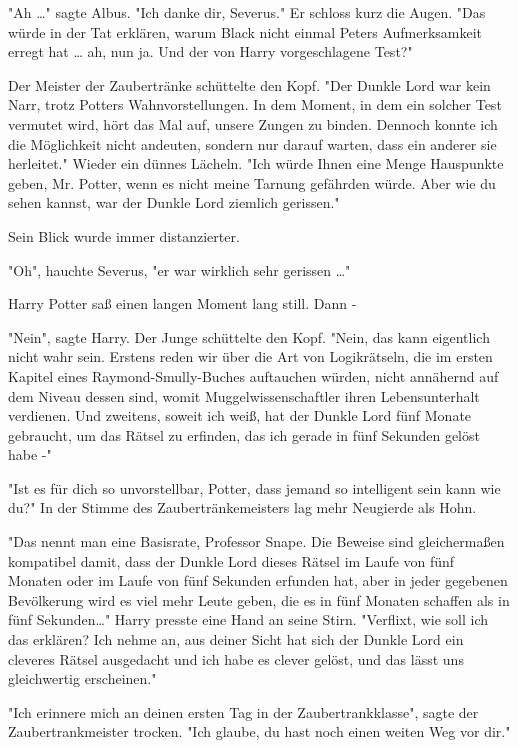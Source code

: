 {"Ah …" sagte Albus. "Ich danke dir, Severus." Er schloss kurz die Augen. "Das würde in der Tat erklären, warum Black nicht einmal Peters Aufmerksamkeit erregt hat … ah, nun ja. Und der von Harry vorgeschlagene Test?"

Der Meister der Zaubertränke schüttelte den Kopf. "Der Dunkle Lord war kein Narr, trotz Potters Wahnvorstellungen. In dem Moment, in dem ein solcher Test vermutet wird, hört das Mal auf, unsere Zungen zu binden. Dennoch konnte ich die Möglichkeit nicht andeuten, sondern nur darauf warten, dass ein anderer sie herleitet." Wieder ein dünnes Lächeln. "Ich würde Ihnen eine Menge Hauspunkte geben, Mr. Potter, wenn es nicht meine Tarnung gefährden würde. Aber wie du sehen kannst, war der Dunkle Lord ziemlich gerissen."

Sein Blick wurde immer distanzierter.

"Oh", hauchte Severus, "er war wirklich sehr gerissen …"

Harry Potter saß einen langen Moment lang still. Dann -

"Nein", sagte Harry. Der Junge schüttelte den Kopf. "Nein, das kann eigentlich nicht wahr sein. Erstens reden wir über die Art von Logikrätseln, die im ersten Kapitel eines Raymond-Smully-Buches auftauchen würden, nicht annähernd auf dem Niveau dessen sind, womit Muggelwissenschaftler ihren Lebensunterhalt verdienen. Und zweitens, soweit ich weiß, hat der Dunkle Lord fünf Monate gebraucht, um das Rätsel zu erfinden, das ich gerade in fünf Sekunden gelöst habe -"

"Ist es für dich so unvorstellbar, Potter, dass jemand so intelligent sein kann wie du?" In der Stimme des Zaubertränkemeisters lag mehr Neugierde als Hohn.

"Das nennt man eine Basisrate, Professor Snape. Die Beweise sind gleichermaßen kompatibel damit, dass der Dunkle Lord dieses Rätsel im Laufe von fünf Monaten oder im Laufe von fünf Sekunden erfunden hat, aber in jeder gegebenen Bevölkerung wird es viel mehr Leute geben, die es in fünf Monaten schaffen als in fünf Sekunden…" Harry presste eine Hand an seine Stirn. "Verflixt, wie soll ich das erklären? Ich nehme an, aus deiner Sicht hat sich der Dunkle Lord ein cleveres Rätsel ausgedacht und ich habe es clever gelöst, und das lässt uns gleichwertig erscheinen."

"Ich erinnere mich an deinen ersten Tag in der Zaubertrankklasse", sagte der Zaubertrankmeister trocken. "Ich glaube, du hast noch einen weiten Weg vor dir."

}
